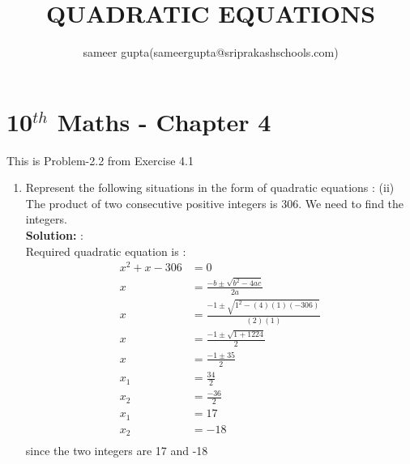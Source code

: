 \documentclass[10pt]{article}
\title{QUADRATIC EQUATIONS}
\author{sameer gupta(sameergupta@sriprakashschools.com)}
\newcommand{\solution}{\noindent \textbf{Solution: }}
\begin{document}
    \maketitle
    \section*{10$^{th}$ Maths - Chapter 4}
    This is Problem-2.2 from Exercise 4.1
    \begin{enumerate}
    \item Represent the following situations in the form of quadratic equations :
(ii) The product of two consecutive positive integers is 306. We need to find the
integers.\\
\solution:\\Required quadratic equation is :
\begin{align}
x^2+x-306&= 0\\
x&=\frac{-b\pm\sqrt{b^2-4ac}}{2a}\\
x&=\frac{-1\pm\sqrt{1^2-(4)(1)(-306)}}{(2)(1)}\\
x&=\frac{-1\pm\sqrt{1+1224}}{2}\\
x&=\frac{-1\pm 35}{2}\\
x_1&=\frac{34}{2}\\
x_2&=\frac{-36}{2}\\
x_1&=17\\
x_2&=-18\\
\end{align}
since the two integers are 17 and -18
\end{enumerate}
\end{document}
